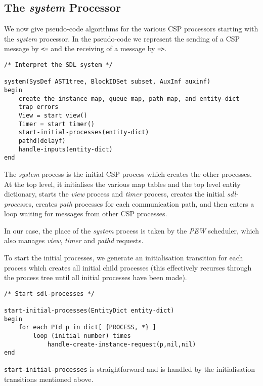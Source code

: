 \subsection{The {\em system} Processor}

We now give pseudo-code algorithms for the various CSP processors
starting with the {\em system} processor. 
In the pseudo-code we represent the sending of a CSP message by {\tt <=}
and the receiving of a message by {\tt =>}.

\begin{verbatim}
/* Interpret the SDL system */

system(SysDef AST1tree, BlockIDSet subset, AuxInf auxinf)
begin
    create the instance map, queue map, path map, and entity-dict
    trap errors
    View = start view()
    Timer = start timer()
    start-initial-processes(entity-dict)
    pathd(delayf)
    handle-inputs(entity-dict)
end
\end{verbatim}

The {\em system} process is the initial CSP process which creates 
the other processes. 
At the top level, it initialises the various
map tables and the top level entity dictionary, starts the {\em view}
process and {\em timer} process, creates the initial {\em
sdl-process}es, creates {\em path} processes for each communication
path, and then enters a loop waiting for messages from other CSP
processes.

In our case, the place of the {\em system} process is taken by the
{\em PEW} scheduler, which also manages {\em view}, {\em timer}
and {\em pathd} requests.

To start the initial processes, we generate an initialisation
transition for each process which creates all initial child processes
(this effectively recurses through the process tree until all initial
processes have been made).

\begin{verbatim}
/* Start sdl-processes */

start-initial-processes(EntityDict entity-dict)
begin
    for each PId p in dict[ {PROCESS, *} ]
        loop (initial number) times
            handle-create-instance-request(p,nil,nil)
end
\end{verbatim}

{\tt start-initial-processes} is straightforward and is handled
by the initialisation transitions mentioned above.

